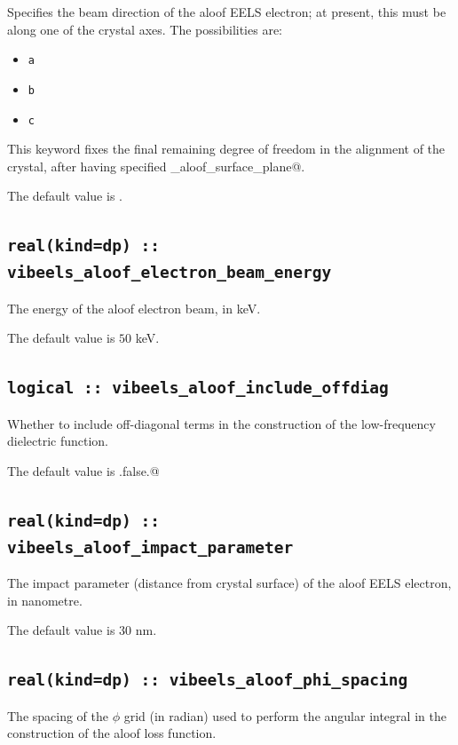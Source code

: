 \documentclass[a4paper,11pt,twoside]{book}
\begin{document}
{Specifies the beam direction of the aloof EELS electron; at present, this must be along one of the crystal axes. The possibilities are:
\begin{itemize}
\item[{\bf --}]  \verb#a#
\item[{\bf --}]  \verb#b#
\item[{\bf --}]  \verb#c#
\end{itemize}

This keyword fixes the final remaining degree of freedom in the alignment of the crystal, after having specified \verb@vibeels_aloof_surface_plane@.

The default value is \verb@a@.

\subsection[vibeels\_aloof\_electron\_beam\_energy]{\tt real(kind=dp) :: vibeels\_aloof\_electron\_beam\_energy}

The energy of the aloof electron beam, in keV.

The default value is $50$ keV.

\subsection[vibeels\_aloof\_include\_offdiag]{\tt logical :: vibeels\_aloof\_include\_offdiag}

Whether to include off-diagonal terms in the construction of the low-frequency dielectric function.

The default value is \verb@.false.@

\subsection[vibeels\_aloof\_impact\_parameter]{\tt real(kind=dp) :: vibeels\_aloof\_impact\_parameter}

The impact parameter (distance from crystal surface) of the aloof EELS electron, in nanometre.

The default value is $30$ nm.

\subsection[vibeels\_aloof\_phi\_spacing]{\tt real(kind=dp) :: vibeels\_aloof\_phi\_spacing}

The spacing of the $\phi$ grid (in radian) used to perform the angular integral in the construction of the aloof loss function.

}
\end{document}
